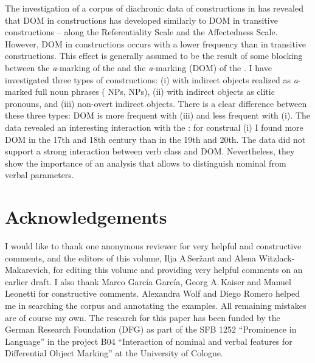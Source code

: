\documentclass[output=paper]{LSP/langsci}
\begin{document}
The investigation of a corpus of diachronic data of  constructions in  has revealed that DOM in  constructions has developed similarly to DOM in transitive constructions – along the Referentiality Scale and the Affectedness Scale. However, DOM in  constructions occurs with a lower frequency than in transitive constructions. This effect is generally assumed to be the result of some blocking between the \textit{a}-marking of the  and the \textit{a}-marking (\ie DOM) of the . I have investigated three types of  constructions: (i) with indirect objects realized as \textit{a}-marked full noun phrases ( NPs,  NPs), (ii) with indirect objects as clitic pronouns, and (iii) non-overt indirect objects. There is a clear difference between these three types: DOM is more frequent with (iii) and less frequent with (i). The data revealed an interesting interaction with the : for construal (i) I found more DOM in the 17th and 18th century than in the 19th and 20th. The data did not support a strong interaction between verb class and DOM. Nevertheless, they show the importance of an analysis that allows to distinguish nominal from verbal parameters.

\section*{Acknowledgements}

I would like to thank one anonymous reviewer for very helpful and constructive comments, and the editors of this volume, Ilja A\,Seržant and Alena Witzlack-Makarevich, for editing this volume and providing very helpful comments on an earlier draft. I also thank Marco García García, Georg A.\,Kaiser and Manuel Leonetti for constructive comments. 
Alexandra Wolf and Diego Romero helped me in searching the corpus and annotating the examples. All remaining mistakes are of course my own. 
The research for this paper has been funded by the German Research Foundation (DFG) as part of the SFB 1252 “Prominence in Language” in the project B04 “Interaction of nominal and verbal features for Differential Object Marking” at the University 
of Cologne.
\end{document}
